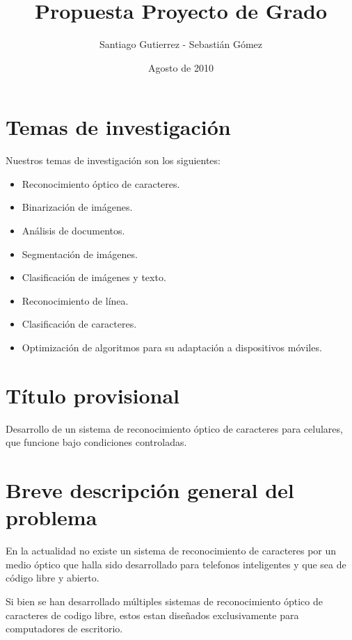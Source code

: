 \documentclass[a4paper, 11pt, oneside]{article}
\begin{document}
\title {Propuesta Proyecto de Grado}
\author { Santiago Gutierrez - Sebastián Gómez }
\date {Agosto de 2010}
\maketitle
	
	\clearpage
	\section{Temas de investigación}
   Nuestros temas de investigación son los siguientes:
	\begin{itemize}
   \item Reconocimiento óptico de caracteres.
   \item Binarización de imágenes.
   \item Análisis de documentos.
   \item Segmentación de imágenes.
   \item Clasificación de imágenes y texto.
   \item Reconocimiento de línea.
   \item Clasificación de caracteres.
	\item Optimización de algoritmos para su adaptación a dispositivos móviles.
	\end{itemize}
	\clearpage
	\section{Título provisional}
	Desarrollo de un sistema de reconocimiento óptico de caracteres para celulares, que funcione bajo condiciones controladas.
	\clearpage
	\section{Breve descripción general del problema}
	En la actualidad no existe un sistema de reconocimiento de caracteres por un medio óptico que halla sido desarrollado para telefonos inteligentes y que sea de código libre y abierto.

	Si bien se han desarrollado múltiples sistemas de reconocimiento óptico de caracteres de codigo libre, estos estan diseñados exclusivamente para computadores de escritorio.
\end{document}
